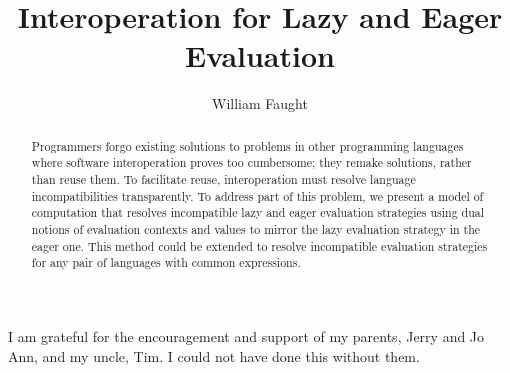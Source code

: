 \documentclass[12pt]{ucthesis}
\begin{document}
\title{Interoperation for Lazy and Eager Evaluation}
\author{William Faught}
\maketitle
\begin{frontmatter}
\copyrightpage
\approvalpage

\begin{abstract}
Programmers forgo existing solutions to problems in other programming languages where software interoperation proves too cumbersome; they remake solutions, rather than reuse them. To facilitate reuse, interoperation must resolve language incompatibilities transparently. To address part of this problem, we present a model of computation that resolves incompatible lazy and eager evaluation strategies using dual notions of evaluation contexts and values to mirror the lazy evaluation strategy in the eager one. This method could be extended to resolve incompatible evaluation strategies for any pair of languages with common expressions.
\end{abstract}

\begin{acknowledgements}
\indent\indent I am grateful for the encouragement and support of my parents, Jerry and Jo Ann, and my uncle, Tim. I could not have done this without them.
\end{acknowledgements}

\tableofcontents
\listoffigures
\end{frontmatter}
\pagestyle{plain}
\renewcommand{\baselinestretch}{1.66}






\clearpage



\end{document}

